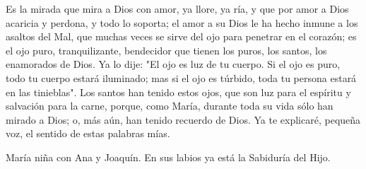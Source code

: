 \documentclass[12pt]{book} %
\begin{document}
Es la mirada que mira a Dios con amor, ya llore, ya ría, y que por amor a Dios acaricia y perdona, y todo lo soporta; el 
amor a su Dios le ha hecho inmune a los asaltos del Mal, que muchas veces se sirve del ojo para penetrar en el corazón; es el ojo puro, tranquilizante, bendecidor que tienen los puros, los santos, los enamorados de Dios. 
Ya lo dije: "El ojo es luz de tu cuerpo. Si el ojo es puro, todo tu cuerpo estará iluminado; mas si el ojo es túrbido, toda tu 
persona estará en las tinieblas". Los santos han tenido estos ojos, que son luz para el espíritu y salvación para la carne, porque, como María, durante toda su vida sólo han mirado a Dios; o, más aún, han tenido recuerdo de Dios. Ya te explicaré, pequeña voz, el sentido de estas palabras mías. 
 
María niña con Ana y Joaquín. En sus labios ya está la Sabiduría del Hijo. 
 
\end{document}
